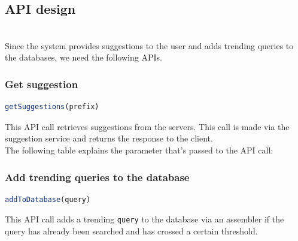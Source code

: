 \subsection{API design}\label{JthX2IMg3WoOdooxmp1kc}
\\
Since the system provides suggestions to the user and adds trending queries to the databases, we need the following APIs.

\subsubsection{Get suggestion}\label{ofuIFOCYBrS_Rj7JV1r42}

\begin{lstlisting}[language=JavaScript]
getSuggestions(prefix)
\end{lstlisting}

This API call retrieves suggestions from the servers. This call is made via the suggestion service and returns the response to the client.
\\
The following table explains the parameter that's passed to the API call:

\begin{table}[htbp]
\centering
\small
{}
\end{table}

\subsubsection{Add trending queries to the database}\label{bPgxm8QXvc5naPa0XaLaW}

\begin{lstlisting}[language=JavaScript]
addToDatabase(query)
\end{lstlisting}

This API call adds a trending \texttt{query} to the database via an assembler if the query has already been searched and has crossed a certain threshold.

\begin{table}[htbp]
\centering
\small
{}
\end{table}

